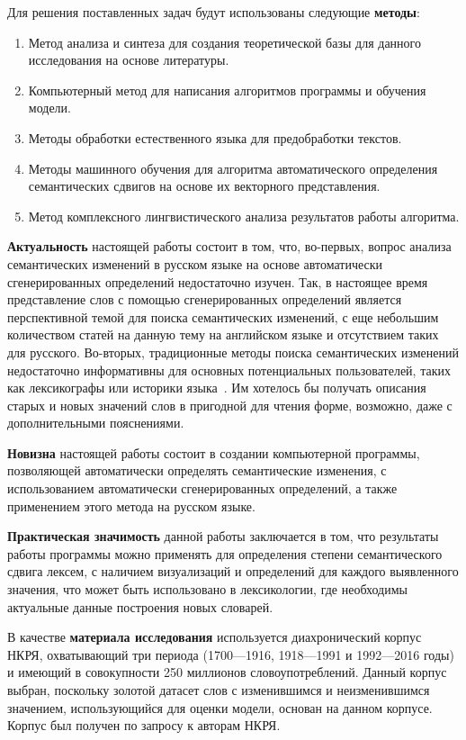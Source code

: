 \documentclass[LI,VKR]{HSEUniversity}
\begin{document}
Для решения поставленных задач будут использованы следующие \textbf{методы}:
\begin{enumerate}
    \item  Метод анализа и синтеза для создания теоретической базы для данного исследования на основе
литературы.
    \item  Компьютерный метод для написания алгоритмов программы и обучения модели.
    \item  Методы обработки естественного языка для предобработки текстов.
    \item  Методы машинного обучения для алгоритма автоматического определения семантических сдвигов на
основе их векторного представления.
    \item  Метод комплексного лингвистического анализа результатов работы алгоритма.
\end{enumerate}

\textbf{Актуальность} настоящей работы состоит в том, что, во-первых, вопрос анализа семантических
изменений в русском языке на основе автоматически сгенерированных определений недостаточно
изучен. Так, в настоящее время представление слов с помощью сгенерированных определений
является перспективной темой для поиска семантических изменений, с еще небольшим
количеством статей на данную тему на английском языке и отсутствием таких для русского.
Во-вторых, традиционные методы поиска семантических изменений недостаточно информативны
для основных потенциальных пользователей, таких как лексикографы или историки языка~\cite{DefinitionGenerationMainArticle}. Им хотелось бы получать описания старых и новых значений слов в пригодной для чтения форме, возможно, даже с дополнительными пояснениями.

\textbf{Новизна} настоящей работы состоит в создании компьютерной программы, позволяющей автоматически
определять семантические изменения, с использованием автоматически сгенерированных определений,
а также применением этого метода на русском языке.

\textbf{Практическая значимость} данной работы заключается в том, что результаты работы программы можно
применять для определения степени семантического сдвига лексем, с наличием визуализаций и
определений для каждого выявленного значения, что может быть использовано в лексикологии,
где необходимы актуальные данные построения новых словарей.

В качестве \textbf{материала исследования} используется диахронический корпус НКРЯ, охватывающий три
периода (1700—1916, 1918—1991 и 1992—2016 годы) и имеющий в совокупности 250 миллионов
словоупотреблений. Данный корпус выбран, поскольку золотой датасет слов с изменившимся
и неизменившимся значением, использующийся для оценки модели, основан на данном корпусе.
Корпус был получен по запросу к авторам НКРЯ.
\end{document}
